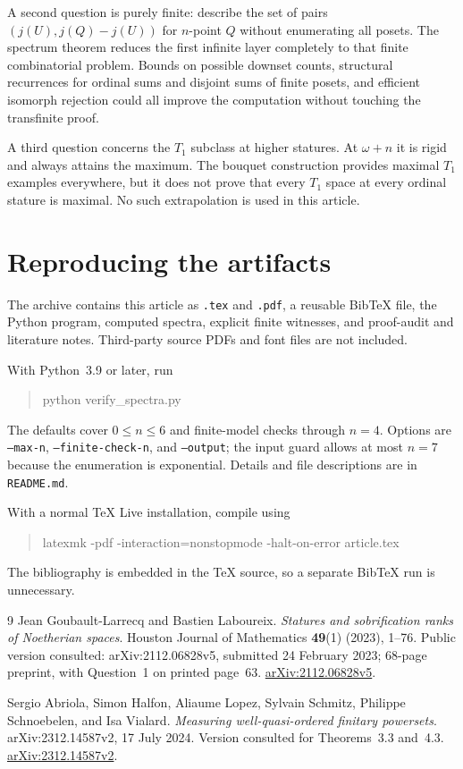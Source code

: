 \documentclass[11pt,a4paper]{article}
\theoremstyle{definition}
\numberwithin{equation}{section}
\begin{document}
A second question is purely finite: describe the set of pairs
$(j(U),j(Q)-j(U))$ for $n$-point $Q$ without enumerating all posets.
The spectrum theorem reduces the first infinite layer completely to
that finite combinatorial problem.  Bounds on possible downset counts,
structural recurrences for ordinal sums and disjoint sums of finite
posets, and efficient isomorph rejection could all improve the
computation without touching the transfinite proof.

A third question concerns the $T_1$ subclass at higher statures.  At
$\omega+n$ it is rigid and always attains the maximum.  The bouquet
construction provides maximal $T_1$ examples everywhere, but it does
not prove that every $T_1$ space at every ordinal stature is maximal.
No such extrapolation is used in this article.

\appendix
\section{Reproducing the artifacts}

The archive contains this article as \texttt{.tex} and \texttt{.pdf}, a
reusable Bib\TeX{} file, the Python program, computed spectra, explicit
finite witnesses, and proof-audit and literature notes.  Third-party
source PDFs and font files are not included.

With Python~3.9 or later, run
\begin{quote}\ttfamily
python verify\_spectra.py
\end{quote}
The defaults cover $0\leq n\leq6$ and finite-model checks through $n=4$.
Options are \texttt{--max-n}, \texttt{--finite-check-n}, and
\texttt{--output}; the input guard allows at most $n=7$ because the
enumeration is exponential.  Details and file descriptions are in
\texttt{README.md}.

With a normal TeX Live installation, compile using
\begin{quote}\ttfamily
latexmk -pdf -interaction=nonstopmode -halt-on-error article.tex
\end{quote}
The bibliography is embedded in the TeX source, so a separate Bib\TeX{}
run is unnecessary.

\begin{thebibliography}{9}
Jean Goubault-Larrecq and Bastien Laboureix.
\newblock \emph{Statures and sobrification ranks of Noetherian spaces}.
\newblock Houston Journal of Mathematics \textbf{49}(1) (2023), 1--76.
\newblock Public version consulted: arXiv:2112.06828v5, submitted
24 February 2023; 68-page preprint, with Question~1 on printed page~63.
\newblock \href{https://arxiv.org/abs/2112.06828v5}{arXiv:2112.06828v5}.

Sergio Abriola, Simon Halfon, Aliaume Lopez, Sylvain Schmitz,
Philippe Schnoebelen, and Isa Vialard.
\newblock \emph{Measuring well-quasi-ordered finitary powersets}.
\newblock arXiv:2312.14587v2, 17 July 2024.
\newblock Version consulted for Theorems~3.3 and~4.3.
\newblock \href{https://arxiv.org/abs/2312.14587v2}{arXiv:2312.14587v2}.
\end{thebibliography}
\end{document}
